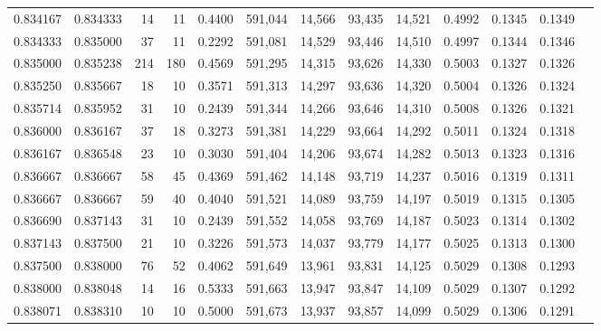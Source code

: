 \begin{tabular}{rrrrrrrrrrrrr}
0.834167 & 0.834333 &    14 &  11 &                                     0.4400 & 591,044 &  14,566 &  93,435 &  14,521 & 0.4992 & 0.1345 & 0.1349 \\
0.834333 & 0.835000 &    37 &  11 &                                     0.2292 & 591,081 &  14,529 &  93,446 &  14,510 & 0.4997 & 0.1344 & 0.1346 \\
0.835000 & 0.835238 &   214 & 180 &                                     0.4569 & 591,295 &  14,315 &  93,626 &  14,330 & 0.5003 & 0.1327 & 0.1326 \\
0.835250 & 0.835667 &    18 &  10 &                                     0.3571 & 591,313 &  14,297 &  93,636 &  14,320 & 0.5004 & 0.1326 & 0.1324 \\
0.835714 & 0.835952 &    31 &  10 &                                     0.2439 & 591,344 &  14,266 &  93,646 &  14,310 & 0.5008 & 0.1326 & 0.1321 \\
0.836000 & 0.836167 &    37 &  18 &                                     0.3273 & 591,381 &  14,229 &  93,664 &  14,292 & 0.5011 & 0.1324 & 0.1318 \\
0.836167 & 0.836548 &    23 &  10 &                                     0.3030 & 591,404 &  14,206 &  93,674 &  14,282 & 0.5013 & 0.1323 & 0.1316 \\
0.836667 & 0.836667 &    58 &  45 &                                     0.4369 & 591,462 &  14,148 &  93,719 &  14,237 & 0.5016 & 0.1319 & 0.1311 \\
0.836667 & 0.836667 &    59 &  40 &                                     0.4040 & 591,521 &  14,089 &  93,759 &  14,197 & 0.5019 & 0.1315 & 0.1305 \\
0.836690 & 0.837143 &    31 &  10 &                                     0.2439 & 591,552 &  14,058 &  93,769 &  14,187 & 0.5023 & 0.1314 & 0.1302 \\
0.837143 & 0.837500 &    21 &  10 &                                     0.3226 & 591,573 &  14,037 &  93,779 &  14,177 & 0.5025 & 0.1313 & 0.1300 \\
0.837500 & 0.838000 &    76 &  52 &                                     0.4062 & 591,649 &  13,961 &  93,831 &  14,125 & 0.5029 & 0.1308 & 0.1293 \\
0.838000 & 0.838048 &    14 &  16 &                                     0.5333 & 591,663 &  13,947 &  93,847 &  14,109 & 0.5029 & 0.1307 & 0.1292 \\
0.838071 & 0.838310 &    10 &  10 &                                     0.5000 & 591,673 &  13,937 &  93,857 &  14,099 & 0.5029 & 0.1306 & 0.1291 \\

\end{tabular}
